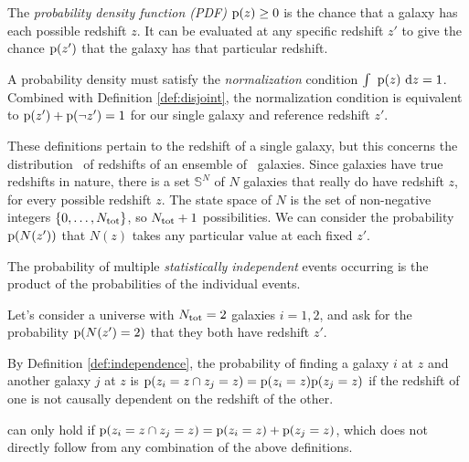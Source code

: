 \begin{definition}\label{def:pdens}
	The \textit{probability density function (PDF)} $\mathrm{p}(z) \geq 0$ is the chance that a galaxy has each possible redshift $z$.
	It can be evaluated at any specific redshift $z'$ to give the chance $\mathrm{p}(z')$ that the galaxy has that particular redshift.
\end{definition}

\begin{definition}\label{def:normalization}
	A probability density must satisfy the \textit{normalization} condition $\int\ \mathrm{p}(z)\ \mathrm{d} z = 1$.
	Combined with Definition \ref{def:disjoint}, the normalization condition is equivalent to $\mathrm{p}(z') + \mathrm{p}(\lnot z') = 1$ for our single galaxy and reference redshift $z'$.
\end{definition}

These definitions pertain to the redshift of a single galaxy, but this \paper concerns the distribution \Nz\ of redshifts of an ensemble of \ntot\ galaxies.
Since galaxies have true redshifts in nature, there is a set $\mathbb{S}^{N}$ of $N$ galaxies that really do have redshift $z$, for every possible redshift $z$.
The state space of $N$ is the set of non-negative integers $\{0, \dots, N_{\mathrm{tot}}\}$, so $N_{\mathrm{tot}} + 1$ possibilities.
We can consider the probability $\mathrm{p}(N(z'))$ that $N(z)$ takes any particular value at each fixed $z'$.

\begin{definition}\label{def:independence}
	The probability of multiple \textit{statistically independent} events occurring is the product of the probabilities of the individual events.
\end{definition}

Let's consider a universe with $N_{\mathrm{tot}} = 2$ galaxies $i = 1, 2$, and ask for the probability $\mathrm{p}(N(z') = 2)$ that they both have redshift $z'$.

\begin{lemma}\label{lem:independence}
	By Definition \ref{def:independence}, the probability of finding a galaxy $i$ at $z$ and another galaxy $j$ at $z$ is $\mathrm{p}(z_{i} = z \cap z_{j} = z) = \mathrm{p}(z_{i} = z) \mathrm{p}(z_{j} = z)$ if the redshift of one is not causally dependent on the redshift of the other.
\end{lemma}

 can only hold if $\mathrm{p}(z_{i} = z \cap z_{j} = z) = \mathrm{p}(z_{i} = z) + \mathrm{p}(z_{j} = z)$, which does not directly follow from any combination of the above definitions.

